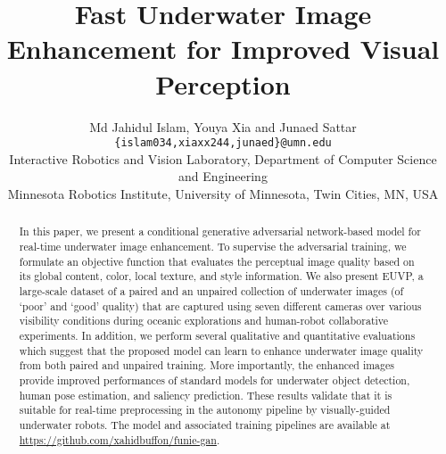\documentclass[10pt,twocolumn,letterpaper]{article}
\begin{document}
\newcommand{\hly}{\colorbox{yellow}}
\newcommand{\hlg}{\colorbox{green}}
\newcommand{\hlp}{\colorbox{pink}}


\title{Fast Underwater Image Enhancement for Improved Visual Perception}

\author{Md Jahidul Islam, Youya Xia and Junaed Sattar \\
{\tt\small \{islam034,xiaxx244,junaed\}@umn.edu} \\
{\small Interactive Robotics and Vision Laboratory, Department of Computer Science and Engineering} \\ 
{\small Minnesota Robotics Institute, University of Minnesota, Twin Cities, MN, USA }
}


\maketitle



\begin{abstract}
In this paper, we present a conditional generative adversarial network-based model for real-time underwater image enhancement. To supervise the adversarial training, we formulate an objective function that evaluates the perceptual image quality based on its global content, color, local texture, and style information. We also present EUVP, a large-scale dataset of a paired and an unpaired collection of underwater images (of `poor' and `good' quality) that are captured using seven different cameras over various visibility conditions during oceanic explorations and human-robot collaborative experiments. In addition, we perform several qualitative and quantitative evaluations which suggest that the proposed model can learn to enhance underwater image quality from both paired and unpaired training. More importantly, the enhanced images provide improved performances of standard models for underwater object detection, human pose estimation, and saliency prediction. These results validate that it is suitable for real-time preprocessing in the autonomy pipeline by visually-guided underwater robots. The model and associated training pipelines are available at \url{https://github.com/xahidbuffon/funie-gan}. 
\end{abstract}
\end{document}
